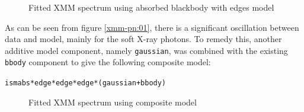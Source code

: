 				\begin{figure}[h!]
					\centering
					\caption{Fitted XMM spectrum using absorbed blackbody with edges model}
					\label{xmm:abs-bb-edge}
				\end{figure}
				
				As can be seen from figure \ref{xmm-pn:01}, there is a significant oscillation between data and model, mainly for the soft X-ray photons. To remedy this, another additive model component, namely \texttt{gaussian}, was combined with the existing \texttt{bbody} component to give the following composite model:
				\begin{center}
					\texttt{ismabs*edge*edge*edge*(gaussian+bbody)}
				\end{center}
				
				
				\begin{figure}[h!]
					\centering
					\caption{Fitted XMM spectrum using composite model}
					\label{xmm:composite}
				\end{figure}
				
